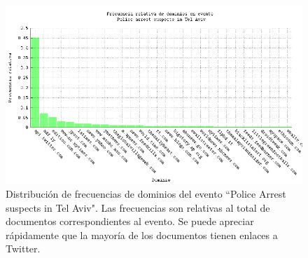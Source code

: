 \documentclass[upright, contnum]{umemoria}
\begin{document}
\begin{figure}[h]
  \centering
  \includegraphics[width=14cm]{./img/telaviv-domain-freqs.png}
  \caption[Dominios evento 1]
   {Distribución de frecuencias de dominios del evento ``Police Arrest
  suspects in Tel Aviv"\label{fig:telaviv-domains}. Las frecuencias son relativas al total de
  documentos correspondientes al evento. Se puede apreciar rápidamente
  que la mayoría de los documentos tienen enlaces a Twitter.}
\end{figure}
\end{document}
